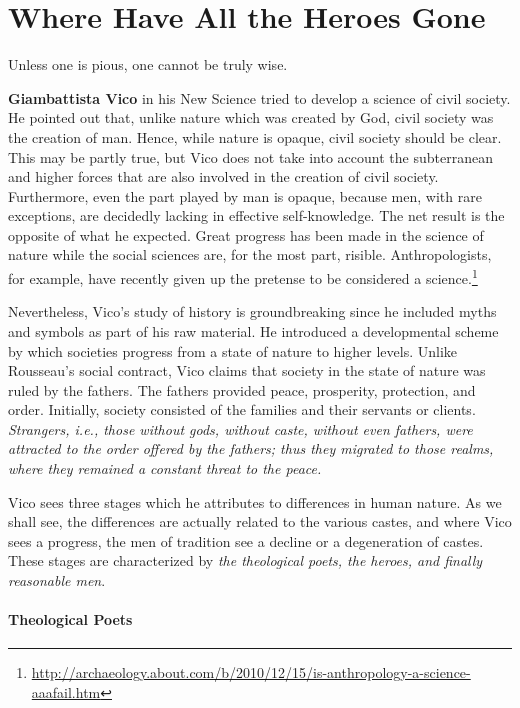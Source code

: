 \section{Where Have All the Heroes Gone}

\begin{quotex}
Unless one is pious, one cannot be truly wise.
\end{quotex}


\textbf{Giambattista Vico} in his New Science tried to develop a science of civil society. He pointed out that, unlike nature which was created by God, civil society was the creation of man. Hence, while nature is opaque, civil society should be clear. This may be partly true, but Vico does not take into account the subterranean and higher forces that are also involved in the creation of civil society. Furthermore, even the part played by man is opaque, because men, with rare exceptions, are decidedly lacking in effective self-knowledge. The net result is the opposite of what he expected. Great progress has been made in the science of nature while the social sciences are, for the most part, risible. Anthropologists, for example, have recently given up the pretense to be considered a science.\footnote{\url{http://archaeology.about.com/b/2010/12/15/is-anthropology-a-science-aaafail.htm}}

Nevertheless, Vico's study of history is groundbreaking since he included myths and symbols as part of his raw material. He introduced a developmental scheme by which societies progress from a state of nature to higher levels. Unlike Rousseau's social contract, Vico claims that society in the state of nature was ruled by the fathers. The fathers provided peace, prosperity, protection, and order. Initially, society consisted of the families and their servants or clients. \emph{Strangers, i.e., those without gods, without caste, without even fathers, were attracted to the order offered by the fathers; thus they migrated to those realms, where they remained a constant threat to the peace.}

Vico sees three stages which he attributes to differences in human nature. As we shall see, the differences are actually related to the various castes, and where Vico sees a progress, the men of tradition see a decline or a degeneration of castes. These stages are characterized by \emph{the theological poets, the heroes, and finally reasonable men}.


\paragraph{Theological Poets}


